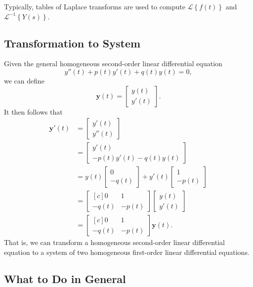 \documentclass{myart}
\renewcommand{\L}[1]{\mathcal{L}\left\{#1\right\}}
\newcommand{\Li}[1]{\mathcal{L}^{-1}\left\{#1\right\}}
\renewcommand{\vec}[1]{\mathbf{#1}}
\newcommand{\Vect}[2]{\begin{bmatrix*} #1 \\ #2 \end{bmatrix*}}
\newcommand{\mat}[2][r]{\begin{bmatrix*}[#1] #2 \end{bmatrix*}}
\begin{document}
Typically, tables of Laplace transforms are used to compute $\L{f(t)}$ and $\Li{Y(s)}$.

\subsection{Transformation to System} \label{subsec:transformation to system}

Given the general homogeneous second-order linear differential equation
\begin{equation*}
y''(t) + p(t) y'(t) + q(t) y(t) = 0,
\end{equation*}
we can define
\begin{equation*}
\vec y(t) = \Vect{y(t)}{y'(t)}.
\end{equation*}
It then follows that
\begin{align*}
\vec y'(t) &= \Vect{y'(t)}{y''(t)} \\
&= \Vect{y'(t)}{-p(t)y'(t) - q(t)y(t)} \\
&= y(t) \Vect{0}{-q(t)} + y'(t) \Vect{1}{-p(t)} \\
&= \mat[c]{0 & 1 \\ -q(t) & -p(t)} \Vect{y(t)}{y'(t)} \\
&= \mat[c]{0 & 1 \\ -q(t) & -p(t)} \vec y(t).
\end{align*}
That is, we can transform a homogeneous second-order linear differential equation to a system of two homogeneous first-order linear differential equations.

\subsection{What to Do in General} \label{subsec:second order strategy}
\end{document}

